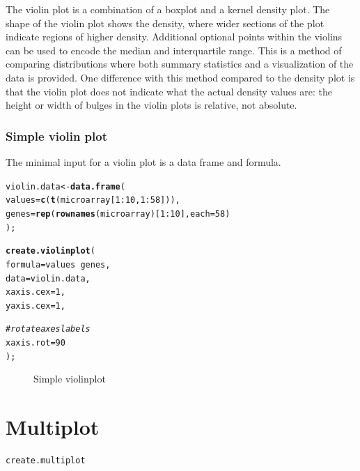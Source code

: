 \documentclass[letterpaper]{report}\usepackage[]{graphicx}\usepackage[]{color}
\makeatletter
\newcommand{\hlnum}[1]{\textcolor[rgb]{0.686,0.059,0.569}{#1}}%
\newcommand{\hlcom}[1]{\textcolor[rgb]{0.678,0.584,0.686}{\textit{#1}}}%
\newcommand{\hlopt}[1]{\textcolor[rgb]{0,0,0}{#1}}%
\newcommand{\hlstd}[1]{\textcolor[rgb]{0.345,0.345,0.345}{#1}}%
\newcommand{\hlkwb}[1]{\textcolor[rgb]{0.69,0.353,0.396}{#1}}%
\newcommand{\hlkwc}[1]{\textcolor[rgb]{0.333,0.667,0.333}{#1}}%
\newcommand{\hlkwd}[1]{\textcolor[rgb]{0.737,0.353,0.396}{\textbf{#1}}}%
\newenvironment{kframe}{%
 \def\at@end@of@kframe{}%
 \ifinner\ifhmode%
  \def\at@end@of@kframe{\end{minipage}}%
  \begin{minipage}{\columnwidth}%
 \fi\fi%
 \def\FrameCommand##1{\hskip\@totalleftmargin \hskip-\fboxsep
 \colorbox{shadecolor}{##1}\hskip-\fboxsep
     \hskip-\linewidth \hskip-\@totalleftmargin \hskip\columnwidth}%
 \MakeFramed {\advance\hsize-\width
   \@totalleftmargin\z@ \linewidth\hsize
   \@setminipage}}%
 {\par\unskip\endMakeFramed%
 \at@end@of@kframe}
\newenvironment{knitrout}{}{} %
\makeatother
\begin{document}
The violin plot is a combination of a boxplot and a kernel density plot. The shape of the violin plot shows the density, where wider sections of the plot indicate regions of higher density. Additional optional points within the violins can be used to encode the median and interquartile range. This is a method of comparing distributions where both summary statistics and a visualization of the data is provided. One difference with this method compared to the density plot is that the violin plot does not indicate what the actual density values are: the height or width of bulges in the violin plots is relative, not absolute.

\subsubsection{Simple violin plot}
The minimal input for a violin plot is a data frame and formula.
\begin{knitrout}
\color{fgcolor}\begin{kframe}
\begin{alltt}
\hlstd{violin.data} \hlkwb{<-} \hlkwd{data.frame}\hlstd{(}
    \hlkwc{values} \hlstd{=} \hlkwd{c}\hlstd{(}\hlkwd{t}\hlstd{(microarray[}\hlnum{1}\hlopt{:}\hlnum{10}\hlstd{,} \hlnum{1}\hlopt{:}\hlnum{58}\hlstd{])),}
    \hlkwc{genes} \hlstd{=} \hlkwd{rep}\hlstd{(}\hlkwd{rownames}\hlstd{(microarray)[}\hlnum{1}\hlopt{:}\hlnum{10}\hlstd{],} \hlkwc{each} \hlstd{=} \hlnum{58}\hlstd{)}
    \hlstd{);}

\hlkwd{create.violinplot}\hlstd{(}
    \hlkwc{formula} \hlstd{= values} \hlopt{~} \hlstd{genes,}
    \hlkwc{data} \hlstd{= violin.data,}
        \hlkwc{xaxis.cex} \hlstd{=} \hlnum{1}\hlstd{,}
        \hlkwc{yaxis.cex} \hlstd{=} \hlnum{1}\hlstd{,}

    \hlcom{# rotate axes labels}
    \hlkwc{xaxis.rot} \hlstd{=} \hlnum{90}
    \hlstd{);}
\end{alltt}
\end{kframe}\begin{figure}

{\centering {} 

}

\caption[Simple violinplot]{Simple violinplot\label{fig:violinplot}}
\end{figure}


\end{knitrout}

\section{Multiplot}
\begin{verbatim}
create.multiplot
\end{verbatim}
\end{document}
